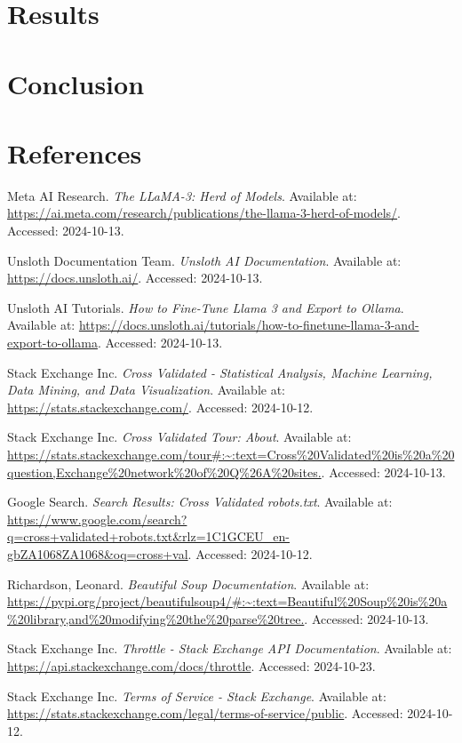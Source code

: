 \documentclass[10pt]{article}
\begin{document}
\section{Results}

\section{Conclusion}

\section{References}
\begin{thebibliography}{9}

Meta AI Research. \textit{The LLaMA-3: Herd of Models}. Available at: \url{https://ai.meta.com/research/publications/the-llama-3-herd-of-models/}. Accessed: 2024-10-13.

Unsloth Documentation Team. \textit{Unsloth AI Documentation}. Available at: \url{https://docs.unsloth.ai/}. Accessed: 2024-10-13.

Unsloth AI Tutorials. \textit{How to Fine-Tune Llama 3 and Export to Ollama}. Available at: \url{https://docs.unsloth.ai/tutorials/how-to-finetune-llama-3-and-export-to-ollama}. Accessed: 2024-10-13.

Stack Exchange Inc. \textit{Cross Validated - Statistical Analysis, Machine Learning, Data Mining, and Data Visualization}. Available at: \url{https://stats.stackexchange.com/}. Accessed: 2024-10-12.

Stack Exchange Inc. \textit{Cross Validated Tour: About}. Available at: \url{https://stats.stackexchange.com/tour#:~:text=Cross%20Validated%20is%20a%20question,Exchange%20network%20of%20Q\%26A\%20sites.}. Accessed: 2024-10-13.

Google Search. \textit{Search Results: Cross Validated robots.txt}. Available at: \url{https://www.google.com/search?q=cross+validated+robots.txt&rlz=1C1GCEU_en-gbZA1068ZA1068&oq=cross+val}. Accessed: 2024-10-12.

Richardson, Leonard. \textit{Beautiful Soup Documentation}. Available at: \url{https://pypi.org/project/beautifulsoup4/#:~:text=Beautiful%20Soup%20is%20a%20library,and%20modifying%20the%20parse%20tree.}. Accessed: 2024-10-13.

Stack Exchange Inc. \textit{Throttle - Stack Exchange API Documentation}. Available at: \url{https://api.stackexchange.com/docs/throttle}. Accessed: 2024-10-23.

Stack Exchange Inc. \textit{Terms of Service - Stack Exchange}. Available at: \url{https://stats.stackexchange.com/legal/terms-of-service/public}. Accessed: 2024-10-12.

\end{thebibliography}
\end{document}
